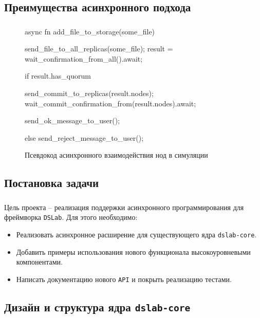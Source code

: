 \documentclass[t]{beamer}  %
\begin{document}
	\subsection{Преимущества асинхронного подхода}
	\begin{frame}[fragile]
		\frametitle{\insertsection} 
		\framesubtitle{\insertsubsection}

		\begin{figure}
			\footnotesize
			\centering
			\begin{rustcode}
async fn add_file_to_storage(some_file) {
  send_file_to_all_replicas(some_file);
  result = wait_confirmation_from_all().await;

  if result.has_quorum {
    send_commit_to_replicas(result.nodes);
    wait_commit_confirmation_from(result.nodes).await;

    send_ok_message_to_user();
  } else {
    send_reject_message_to_user();
  }
}
			\end{rustcode}
			\caption*{Псевдокод асинхронного взаимодействия нод в симуляции}
		\end{figure}


	\end{frame}

	\subsection{Постановка задачи}
	\begin{frame}[fragile]
		\frametitle{\insertsection} 
		\framesubtitle{\insertsubsection}

		\vspace{0.5cm}
		Цель проекта -- реализация поддержки асинхронного программирования для фреймворка \texttt{DSLab}. Для этого необходимо:
		\vspace{3pt}
		\begin{itemize}
			\item Реализовать асинхронное расширение для существующего ядра \texttt{dslab-core}.
			\item Добавить примеры использования нового функционала высокоуровневыми компонентами.
			\item Написать документацию нового \texttt{API} и покрыть реализацию тестами.
		\end{itemize}


	\end{frame}

\subsection{Дизайн и структура ядра \texttt{dslab-core}}
\end{document}
